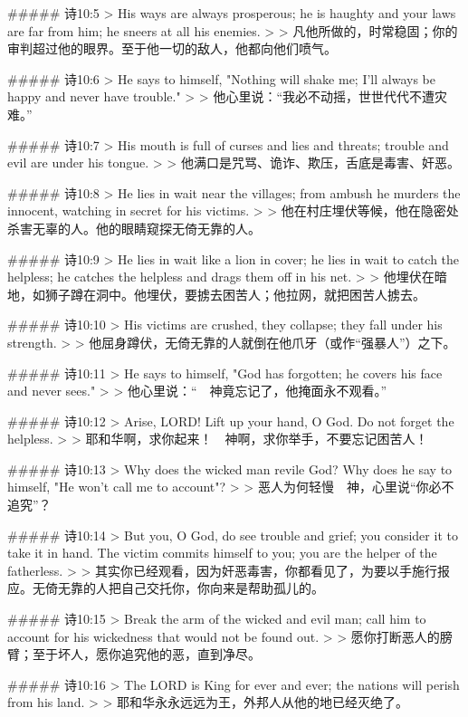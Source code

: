 ##### 诗10:5
> His ways are always prosperous; he is haughty and your laws are far from him; he sneers at all his enemies.
>
> 凡他所做的，时常稳固；你的审判超过他的眼界。至于他一切的敌人，他都向他们喷气。


##### 诗10:6
> He says to himself, "Nothing will shake me; I'll always be happy and never have trouble."
>
> 他心里说：“我必不动摇，世世代代不遭灾难。”


##### 诗10:7
> His mouth is full of curses and lies and threats; trouble and evil are under his tongue.
>
> 他满口是咒骂、诡诈、欺压，舌底是毒害、奸恶。


##### 诗10:8
> He lies in wait near the villages; from ambush he murders the innocent, watching in secret for his victims.
>
> 他在村庄埋伏等候，他在隐密处杀害无辜的人。他的眼睛窥探无倚无靠的人。


##### 诗10:9
> He lies in wait like a lion in cover; he lies in wait to catch the helpless; he catches the helpless and drags them off in his net.
>
> 他埋伏在暗地，如狮子蹲在洞中。他埋伏，要掳去困苦人；他拉网，就把困苦人掳去。


##### 诗10:10
> His victims are crushed, they collapse; they fall under his strength.
>
> 他屈身蹲伏，无倚无靠的人就倒在他爪牙（或作“强暴人”）之下。


##### 诗10:11
> He says to himself, "God has forgotten; he covers his face and never sees."
>
> 他心里说：“　神竟忘记了，他掩面永不观看。”


##### 诗10:12
> Arise, LORD! Lift up your hand, O God. Do not forget the helpless.
>
> 耶和华啊，求你起来！　神啊，求你举手，不要忘记困苦人！


##### 诗10:13
> Why does the wicked man revile God? Why does he say to himself, "He won't call me to account"?
>
> 恶人为何轻慢　神，心里说“你必不追究”？


##### 诗10:14
> But you, O God, do see trouble and grief; you consider it to take it in hand. The victim commits himself to you; you are the helper of the fatherless.
>
> 其实你已经观看，因为奸恶毒害，你都看见了，为要以手施行报应。无倚无靠的人把自己交托你，你向来是帮助孤儿的。


##### 诗10:15
> Break the arm of the wicked and evil man; call him to account for his wickedness that would not be found out.
>
> 愿你打断恶人的膀臂；至于坏人，愿你追究他的恶，直到净尽。


##### 诗10:16
> The LORD is King for ever and ever; the nations will perish from his land.
>
> 耶和华永永远远为王，外邦人从他的地已经灭绝了。


